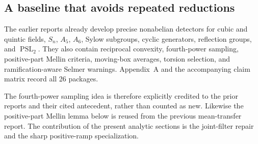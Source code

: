 \subsection{A baseline that avoids repeated reductions}

The earlier reports already develop precise nonabelian detectors for cubic and quintic fields, $S_n$, $A_5$, $A_6$, Sylow subgroups, cyclic generators, reflection groups, and $\operatorname{PSL}_2$. They also contain reciprocal convexity, fourth-power sampling, positive-part Mellin criteria, moving-box averages, torsion selection, and ramification-aware Selmer warnings. Appendix~A and the accompanying claim matrix record all 26 packages.\cite{priorCollection}

The fourth-power sampling idea is therefore explicitly credited to the prior reports and their cited antecedent, rather than counted as new. Likewise the positive-part Mellin lemma below is reused from the previous mean-transfer report. The contribution of the present analytic sections is the joint-filter repair and the sharp positive-ramp specialization.\cite{priorSampling,priorMean,Setiawan}
